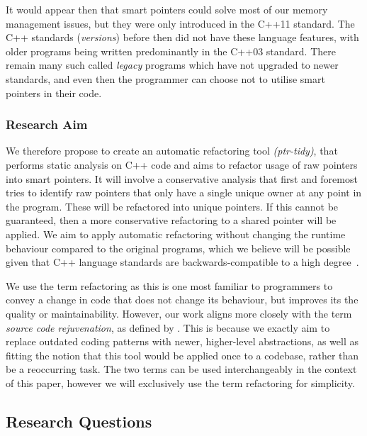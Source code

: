 \documentclass{proposal}
\begin{document}
    It would appear then that smart pointers could solve most of our memory management issues, but they were only introduced in the C++11 standard.
    The C++ standards (\textit{versions}) before then did not have these language features, with older programs being written predominantly in the C++03 standard.
    There remain many such called \emph{legacy} programs which have not upgraded to newer standards, and even then the programmer can choose not to utilise smart pointers in their code.

    \subsubsection{Research Aim}\label{subsubsec:reseach-aim}


    We therefore propose to create an automatic refactoring tool \emph{(ptr-tidy)}, that performs static analysis on C++ code and aims to refactor usage of raw pointers into smart pointers.
    It will involve a conservative analysis that first and foremost tries to identify raw pointers that only have a single unique owner at any point in the program.
    These will be refactored into unique pointers.
    If this cannot be guaranteed, then a more conservative refactoring to a shared pointer will be applied.
    We aim to apply automatic refactoring without changing the runtime behaviour compared to the original programs, which we believe will be possible given that C++ language standards are backwards-compatible to a high degree~\cite{Winters2020}.

    We use the term refactoring as this is one most familiar to programmers to convey a change in code that does not change its behaviour, but improves its the quality or maintainability.
    However, our work aligns more closely with the term \emph{source code rejuvenation}, as defined by \citet{Pirkelbauer2010}.
    This is because we exactly aim to replace outdated coding patterns with newer, higher-level abstractions, as well as fitting the notion that this tool would be applied once to a codebase, rather than be a reoccurring task.
    The two terms can be used interchangeably in the context of this paper, however we will exclusively use the term refactoring for simplicity.

    \subsection{Research Questions}\label{subsec:research-questions}
\end{document}
